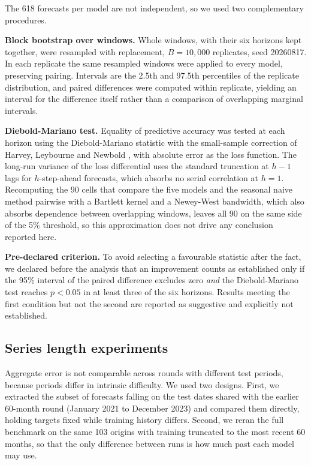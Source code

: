 The 618 forecasts per model are not independent, so we used two complementary procedures.

\textbf{Block bootstrap over windows.} Whole windows, with their six horizons kept
together, were resampled with replacement, $B=10{,}000$ replicates, seed 20260817. In each
replicate the same resampled windows were applied to every model, preserving pairing.
Intervals are the 2.5th and 97.5th percentiles of the replicate distribution, and paired
differences were computed within replicate, yielding an interval for the difference itself
rather than a comparison of overlapping marginal intervals.

\textbf{Diebold-Mariano test.} Equality of predictive accuracy was tested at each horizon
using the Diebold-Mariano statistic \citep{diebold1995} with the small-sample correction of
Harvey, Leybourne and Newbold \citep{harvey1997}, with absolute error as the loss function.
The long-run variance of the loss differential uses the standard truncation at $h-1$ lags
for $h$-step-ahead forecasts, which absorbs no serial correlation at $h=1$. Recomputing the 90
cells that compare the five models and the seasonal naive method pairwise with a Bartlett
kernel and a Newey-West bandwidth, which also absorbs dependence between overlapping
windows, leaves all 90 on the same side of the 5\% threshold, so
this approximation does not drive any conclusion reported here.

\textbf{Pre-declared criterion.} To avoid selecting a favourable statistic after the fact,
we declared before the analysis that an improvement counts as established only if the 95\%
interval of the paired difference excludes zero \emph{and} the Diebold-Mariano test reaches
$p<0.05$ in at least three of the six horizons. Results meeting the first condition but not
the second are reported as suggestive and explicitly not established.

\subsection{Series length experiments}

Aggregate error is not comparable across rounds with different test periods, because
periods differ in intrinsic difficulty. We used two designs. First, we extracted the subset
of forecasts falling on the test dates shared with the earlier 60-month round (January 2021
to December 2023) and compared them directly, holding targets fixed while training history
differs. Second, we reran the full benchmark on the same 103 origins with training
truncated to the most recent 60 months, so that the only difference between runs is how
much past each model may use.

